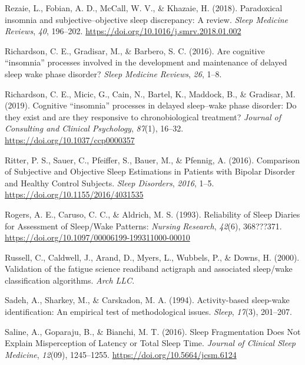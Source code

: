\documentclass[
]{article}
\newlength{\cslhangindent}
\newenvironment{CSLReferences}[2] %
 {\begin{list}{}{%
  \setlength{\itemindent}{0pt}
  \setlength{\leftmargin}{0pt}
  \setlength{\parsep}{0pt}
  \ifodd #1
   \setlength{\leftmargin}{\cslhangindent}
   \setlength{\itemindent}{-1\cslhangindent}
  \fi
  \setlength{\itemsep}{#2\baselineskip}}}
 {\end{list}}
\begin{document}
\begin{CSLReferences}{1}{0}
Rezaie, L., Fobian, A. D., McCall, W. V., \& Khazaie, H. (2018). {Paradoxical insomnia and subjective--objective sleep discrepancy: A review}. \emph{Sleep Medicine Reviews}, \emph{40}, 196--202. \url{https://doi.org/10.1016/j.smrv.2018.01.002}

Richardson, C. E., Gradisar, M., \& Barbero, S. C. (2016). Are cognitive {``insomnia''} processes involved in the development and maintenance of delayed sleep wake phase disorder? \emph{Sleep Medicine Reviews}, \emph{26}, 1--8.

Richardson, C. E., Micic, G., Cain, N., Bartel, K., Maddock, B., \& Gradisar, M. (2019). Cognitive {``insomnia''} processes in delayed sleep--wake phase disorder: {Do} they exist and are they responsive to chronobiological treatment? \emph{Journal of Consulting and Clinical Psychology}, \emph{87}(1), 16--32. \url{https://doi.org/10.1037/ccp0000357}

Ritter, P. S., Sauer, C., Pfeiffer, S., Bauer, M., \& Pfennig, A. (2016). Comparison of {Subjective} and {Objective} {Sleep} {Estimations} in {Patients} with {Bipolar} {Disorder} and {Healthy} {Control} {Subjects}. \emph{Sleep Disorders}, \emph{2016}, 1--5. \url{https://doi.org/10.1155/2016/4031535}

Rogers, A. E., Caruso, C. C., \& Aldrich, M. S. (1993). Reliability of {Sleep} {Diaries} for {Assessment} of {Sleep}/{Wake} {Patterns}: \emph{Nursing Research}, \emph{42}(6), 368???371. \url{https://doi.org/10.1097/00006199-199311000-00010}

Russell, C., Caldwell, J., Arand, D., Myers, L., Wubbels, P., \& Downs, H. (2000). Validation of the fatigue science readiband actigraph and associated sleep/wake classification algorithms. \emph{Arch LLC}.

Sadeh, A., Sharkey, M., \& Carskadon, M. A. (1994). Activity-based sleep-wake identification: An empirical test of methodological issues. \emph{Sleep}, \emph{17}(3), 201--207.

Saline, A., Goparaju, B., \& Bianchi, M. T. (2016). Sleep {Fragmentation} {Does} {Not} {Explain} {Misperception} of {Latency} or {Total} {Sleep} {Time}. \emph{Journal of Clinical Sleep Medicine}, \emph{12}(09), 1245--1255. \url{https://doi.org/10.5664/jcsm.6124}


\end{CSLReferences}
\end{document}
